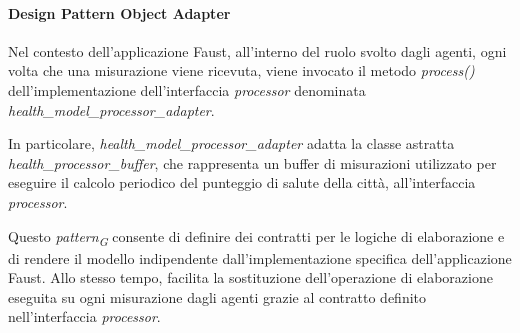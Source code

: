 \paragraph*{Design Pattern Object Adapter}
Nel contesto dell'applicazione Faust, all'interno del ruolo svolto dagli agenti, ogni volta che una misurazione viene ricevuta, viene invocato il metodo \textit{process()} dell'implementazione dell'interfaccia \textit{processor} denominata \textit{health\_model\_processor\_adapter}.

In particolare, \textit{health\_model\_processor\_adapter} adatta la classe astratta \textit{health\_processor\_buffer}, che rappresenta un buffer di misurazioni utilizzato per eseguire il calcolo periodico del punteggio di salute della città, all'interfaccia \textit{processor}.

Questo \textit{pattern}\textsubscript{\textit{G}} consente di definire dei contratti per le logiche di elaborazione e di rendere il modello indipendente dall'implementazione specifica dell'applicazione Faust. Allo stesso tempo, facilita la sostituzione dell'operazione di elaborazione eseguita su ogni misurazione dagli agenti grazie al contratto definito nell'interfaccia \textit{processor}.
